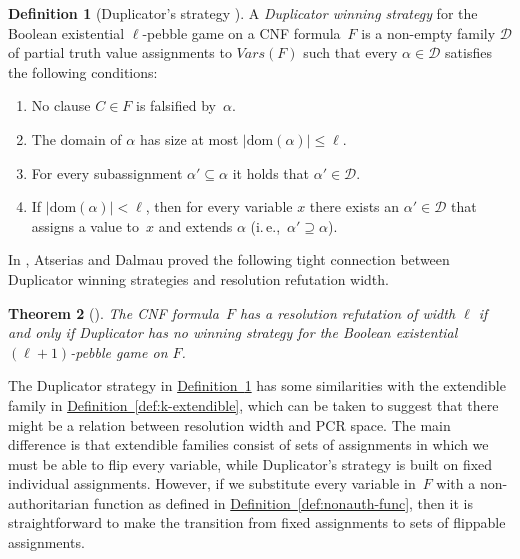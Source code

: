 \documentclass[11pt]{article}
\numberwithin{equation}{section}
\newtheorem{theorem}{Theorem}[section]
\theoremstyle{definition}
\newtheorem{definition}[theorem]{Definition}
\theoremstyle{plain}
\newcommand{\ie}{i.\,e.}
\newcommand{\expref}[2]{\hyperref[#2]{#1~\ref{#2}}}
\theoremstyle{plain}
\theoremstyle{definition}
\newcommand{\refdef}[1]{\expref{Definition}{#1}}
\newcommand{\domainof}[1]{\ensuremath{\mathrm{dom} ( #1 )}}
\newcommand{\setsize}[1]{\lvert#1\rvert}
\newcommand{\introduceterm}[1]{{\emph{#1}}}
\newcommand{\ieComma}{\ie,\ }
\newcommand{\clc}{\ensuremath{C}}
\newcommand{\setsofvarsorlit}[2]{\mathit{#1}({#2})}
\newcommand{\vars}[1]{\setsofvarsorlit{Vars}{#1}}
\newcommand{\flippable}{flippable\xspace}
\newcommand{\kextendibleNok}{extendible\xspace}
\newcommand{\adpebblenumber}{\ell}
\newcommand{\adduplicatorfamily}{\mathcal{D}}
\newcommand{\nonauthor}{non-author\-i\-tar\-ian\xspace}
\begin{document}
\begin{definition}[Duplicator's strategy
  \cite{AD08CombinatoricalCharacterization}]
  \label{def:AD-game}  
%
%
%
%
%
%
%
%
  A
  \introduceterm{Duplicator winning strategy}
  for the Boolean existential $\adpebblenumber$-pebble game on 
  a CNF formula~$F$ is a non-empty family $\adduplicatorfamily$ of
  partial truth value assignments 
%
  to $\vars{F}$
  such that every 
  $\alpha \in \adduplicatorfamily$ 
  satisfies the following conditions:
  \begin{enumerate}
  \item
    No clause $\clc \in F$ is falsified by~$\alpha$.
  \item
    The domain of $\alpha$ has size at most
    $\setsize{\domainof{\alpha}} \leq \adpebblenumber$.
  \item 
    For every 
    subassignment
    $\alpha' \subseteq \alpha$ 
    it holds that
    $\alpha' \in \adduplicatorfamily$.
%
%
%
%
  \item 
    If $\setsize{\domainof{\alpha}} < \adpebblenumber$, then for every
    variable $x$ there exists an $\alpha' \in \adduplicatorfamily$ 
    that assigns a value to~$x$
    and extends $\alpha$ 
    (\ieComma $\alpha' \supseteq \alpha$).
%
%
%
%
  \end{enumerate}
\end{definition}

In \cite{AD08CombinatoricalCharacterization}, Atserias and Dalmau
proved the following tight connection between Duplicator winning strategies 
and resolution refutation width.
%
%

\begin{theorem}[\cite{AD08CombinatoricalCharacterization}]
  \label{th:ADWidthCharacterization}
%
%
%
  The CNF formula~$F$ has a resolution refutation of width
  $\adpebblenumber$ if and only if Duplicator has no winning strategy
  for the Boolean existential $(\adpebblenumber + 1)$-pebble game on $F$.
\end{theorem}

%
%
%
%
%
%
%
%
%
%
%
%
%
%
%
%

The Duplicator strategy in \refdef{def:AD-game} has some similarities
with the \kextendibleNok{} family in \refdef{def:k-extendible}, which
can be taken to suggest that there might be a relation between
resolution width and PCR space. The main difference is that
\kextendibleNok families consist of sets of assignments in
which we must be able to flip every variable, while Duplicator's
strategy is built on fixed individual assignments. However,
if we substitute every variable in~$F$ with a \nonauthor{} function as
defined in \refdef{def:nonauth-func}, then it is straightforward to
make the transition from fixed assignments to sets of \flippable assignments.
%
%
%
%
%
%
%
\end{document}
